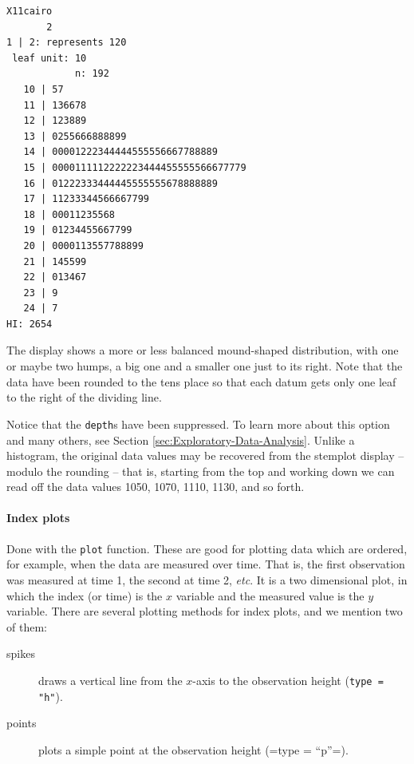 \documentclass[captions=tableheading]{scrbook}
\begin{document}
\begin{verbatim}
X11cairo 
       2
1 | 2: represents 120
 leaf unit: 10
            n: 192
   10 | 57
   11 | 136678
   12 | 123889
   13 | 0255666888899
   14 | 00001222344444555556667788889
   15 | 0000111112222223444455555566677779
   16 | 01222333444445555555678888889
   17 | 11233344566667799
   18 | 00011235568
   19 | 01234455667799
   20 | 0000113557788899
   21 | 145599
   22 | 013467
   23 | 9
   24 | 7
HI: 2654
\end{verbatim}

The display shows a more or less balanced mound-shaped distribution, with one or maybe two humps, a big one and a smaller one just to its right. Note that the data have been rounded to the tens place so that each datum gets only one leaf to the right of the dividing line.

Notice that the \texttt{depth}s have been suppressed. To learn more about this option and many others, see Section \ref{sec:Exploratory-Data-Analysis}. Unlike a histogram, the original data values may be recovered from the stemplot display -- modulo the rounding -- that is, starting from the top and working down we can read off the data values 1050, 1070, 1110, 1130, and so forth. 

\paragraph*{Index plots}

Done with the \texttt{plot} function. These are good for plotting data which are ordered, for example, when the data are measured over time. That is, the first observation was measured at time 1, the second at time 2, \emph{etc}. It is a two dimensional plot, in which the index (or time) is the \(x\) variable and the measured value is the \(y\) variable. There are several plotting methods for index plots, and we mention two of them:

\begin{description}
\item[spikes] draws a vertical line from the \(x\)-axis to the observation height (\texttt{type = "h"}).
\item[points] plots a simple point at the observation height (=type = ``p''=).
\end{description}
\end{document}
